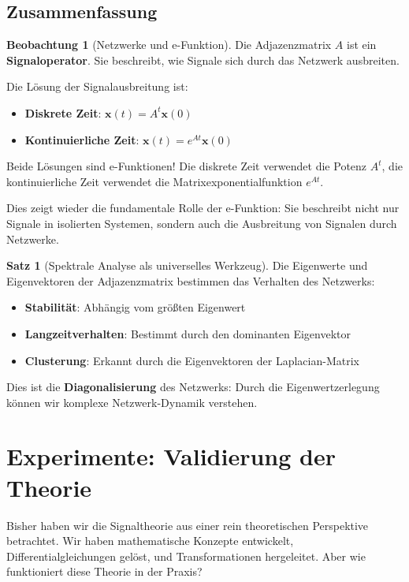 ﻿\documentclass[a4paper,12pt]{report}
\theoremstyle{definition}
\newtheorem{satz}{Satz}
\newtheorem{beobachtung}{Beobachtung}
\begin{document}
	\section{Zusammenfassung}
	
	\begin{beobachtung}[Netzwerke und e-Funktion]
		Die Adjazenzmatrix $A$ ist ein \textbf{Signaloperator}. Sie beschreibt, wie Signale sich durch das Netzwerk ausbreiten.
		
		Die Lösung der Signalausbreitung ist:
		\begin{itemize}
			\item[-] \textbf{Diskrete Zeit}: $\mathbf{x}(t) = A^t \mathbf{x}(0)$
			\item[-] \textbf{Kontinuierliche Zeit}: $\mathbf{x}(t) = e^{At} \mathbf{x}(0)$
		\end{itemize}
		
		Beide Lösungen sind e-Funktionen! Die diskrete Zeit verwendet die Potenz $A^t$, die kontinuierliche Zeit verwendet die Matrixexponentialfunktion $e^{At}$.
		
		Dies zeigt wieder die fundamentale Rolle der e-Funktion: Sie beschreibt nicht nur Signale in isolierten Systemen, sondern auch die Ausbreitung von Signalen durch Netzwerke.
	\end{beobachtung}
	
	\begin{satz}[Spektrale Analyse als universelles Werkzeug]
		Die Eigenwerte und Eigenvektoren der Adjazenzmatrix bestimmen das Verhalten des Netzwerks:
		\begin{itemize}
			\item[-] \textbf{Stabilität}: Abhängig vom größten Eigenwert
			\item[-] \textbf{Langzeitverhalten}: Bestimmt durch den dominanten Eigenvektor
			\item[-] \textbf{Clusterung}: Erkannt durch die Eigenvektoren der Laplacian-Matrix
		\end{itemize}
		
		Dies ist die \textbf{Diagonalisierung} des Netzwerks: Durch die Eigenwertzerlegung können wir komplexe Netzwerk-Dynamik verstehen.
	\end{satz}
	
	\chapter{Experimente: Validierung der Theorie}
	
	Bisher haben wir die Signaltheorie aus einer rein theoretischen Perspektive betrachtet. Wir haben mathematische Konzepte entwickelt, Differentialgleichungen gelöst, und Transformationen hergeleitet. Aber wie funktioniert diese Theorie in der Praxis?
	
\end{document}
